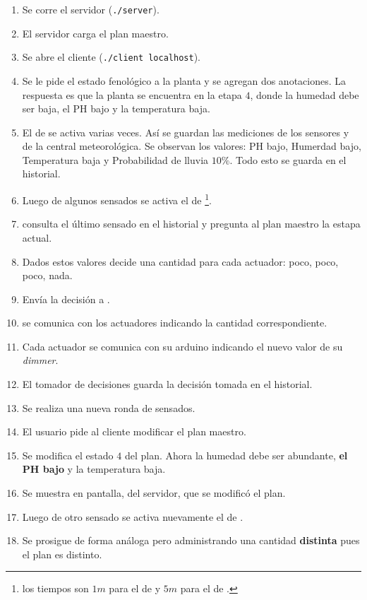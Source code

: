       \begin{enumerate}
        \item Se corre el servidor (\texttt{./server}).
        \item El servidor carga el plan maestro.
        \item Se abre el cliente (\texttt{./client localhost}).
        \item Se le pide el estado fenol\'ogico a la planta y se
            agregan dos anotaciones.
            La respuesta es que la planta se encuentra en la etapa $4$, donde
            la humedad debe ser baja, el PH bajo y la temperatura baja.
        \item El \timer{} de \condiciones{} se activa varias veces. As\'i se guardan las
            mediciones de los sensores y de la central meteorol\'ogica.
            Se observan los valores: PH bajo, Humerdad bajo, Temperatura baja y
            Probabilidad de lluvia $10\%$.
            Todo esto se guarda en el historial.
        \item Luego de algunos sensados se activa el \timer{} de \decisiones{}\footnote{
            los tiempos son $1m$ para el de \condiciones{} y $5m$ para el de \decisiones{}.}.
        \item \decisiones{} consulta el \'ultimo sensado en el historial y pregunta al plan
            maestro la estapa actual.
        \item Dados estos valores decide una cantidad para cada actuador: poco, poco, poco, nada.
        \item Env\'ia la decisi\'on a \manejadorAct{}.
        \item \manejadorAct{} se comunica con los actuadores indicando la cantidad
            correspondiente.
        \item Cada actuador se comunica con su arduino indicando el nuevo valor de su
            \textit{dimmer}.
        \item El tomador de decisiones guarda la decisi\'on tomada en el historial.
        \item Se realiza una nueva ronda de sensados.
        \item El usuario pide al cliente modificar el plan maestro.
        \item Se modifica el estado $4$ del plan. Ahora la humedad debe ser abundante,
            \textbf{el PH bajo} y la temperatura baja.
        \item Se muestra en pantalla, del servidor, que se modific\'o el plan.
        \item Luego de otro sensado se activa nuevamente el \timer{} de \decisiones{}.
        \item Se prosigue de forma an\'aloga pero administrando una cantidad
            \textbf{distinta} pues el plan es distinto.
      \end{enumerate}

